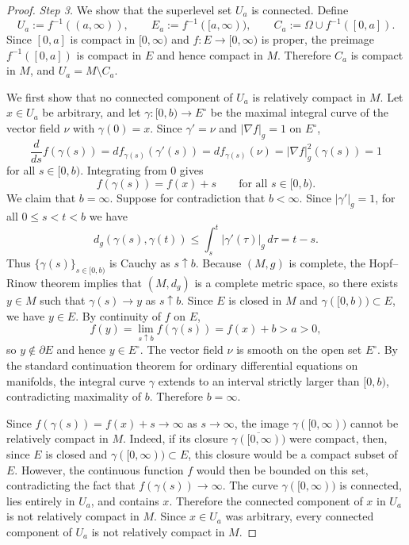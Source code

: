 \documentclass[12pt,oneside,a4paper]{article}
\theoremstyle{mytheorem}
\theoremstyle{remark}
\begin{document}
\begin{proof}
\textit{Step 3.} We show that  the superlevel set $U_a$ is connected.
Define
\[
U_a:=f^{-1}((a,\infty)),\qquad E_a:=f^{-1}([a,\infty)),\qquad C_a:=\Omega\cup f^{-1}([0,a]).
\]
Since $[0,a]$ is compact in $[0,\infty)$ and $f:E\to[0,\infty)$ is proper, the preimage $f^{-1}([0,a])$ is compact in $E$ and hence compact in $M$. Therefore $C_a$ is compact in $M$, and $U_a=M\setminus C_a.$

We first show that no connected component of $U_a$ is  relatively compact in $M$. Let $x\in U_a$ be arbitrary, and let $\gamma:[0,b)\to E^\circ$
be the maximal integral curve of the vector field $\nu$ with $\gamma(0)=x$. Since $\gamma'=\nu$ and $|\nabla f|_g=1$ on $E^\circ$,
\[
\frac{d}{ds}f(\gamma(s))=df_{\gamma(s)}(\gamma'(s))=df_{\gamma(s)}(\nu)=|\nabla f|_g^2(\gamma(s))=1
\]
for all $s\in[0,b)$. Integrating from $0$ gives
\[
f(\gamma(s))=f(x)+s\qquad\text{for all }s\in[0,b).
\]
We claim that $b=\infty$. Suppose for contradiction that $b<\infty$. Since $|\gamma'|_g=1$, for all $0\le s<t<b$ we have
\[
d_g(\gamma(s),\gamma(t))\le\int_s^t|\gamma'(\tau)|_g\,d\tau=t-s.
\]
Thus $\{\gamma(s)\}_{s\in[0,b)}$ is Cauchy as $s\uparrow b$. Because $(M,g)$ is complete, the Hopf--Rinow theorem implies that $(M,d_g)$ is a complete metric space, so there exists $y\in M$ such that $\gamma(s)\to y$ as $s\uparrow b$. Since $E$ is closed in $M$ and $\gamma([0,b))\subset E$, we have $y\in E$. By continuity of $f$ on $E$,
\[
f(y)=\lim_{s\uparrow b}f(\gamma(s))=f(x)+b>a>0,
\]
so $y\notin\partial E$ and hence $y\in E^\circ$. The vector field $\nu$ is smooth on the open set $E^\circ$. By the standard continuation theorem for ordinary differential equations on manifolds, the integral curve $\gamma$ extends to an interval strictly larger than $[0,b)$, contradicting maximality of $b$. Therefore $b=\infty$.

Since $f(\gamma(s))=f(x)+s\to\infty$ as $s\to\infty$, the image $\gamma([0,\infty))$ cannot be relatively compact in $M$. Indeed, if its closure \( \overline{\gamma([0,\infty))} \) were compact, then, since \( E \) is closed and \( \gamma([0,\infty)) \subset E \), this closure would be a compact subset of \( E \). 
However, the continuous function \( f \) would then be bounded on this set, contradicting the fact that \( f(\gamma(s)) \to \infty \). The curve $\gamma([0,\infty))$ is connected, lies entirely in $U_a$, and contains $x$. Therefore the connected component of $x$ in $U_a$ is not relatively compact in $M$. Since $x\in U_a$ was arbitrary, every connected component of $U_a$ is not relatively compact in $M$.


\end{proof}
\end{document}

